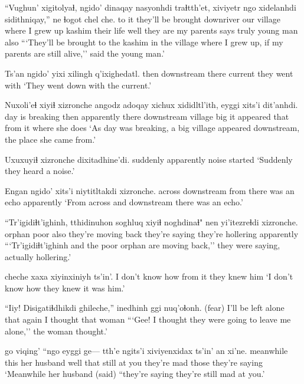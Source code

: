 \documentclass[12pt]{article}
\begin{document}
\gll ``Vughun' xigitolyaɬ, ngido'    dinaqay     nasyonhdi      traɬtth'et, xiviyetr   ngo  xidelanhdi sidithniqay,'' ne   ɬogot chel che.
{to it} {they'll be brought} downriver {our village} {where I grew up} kashim {their life} well {they are}    {my parents}  says  truly {young man} also
\glt ```They'll be brought to the kashim in the village where I grew up, if my parents are still alive,'' said the young man.'
\glend

\gll Ts'an ngido'     yixi  xilingh q'ixighedatl.
then  downstream there current {they went with }
\glt `They went down with the current.'
\glend

\gll Nuxoli'eɬ       xiyiɬ xizronche angodz adoqay xichux  xididltl'ith, eyggi xits'i  dit'anhdi.
{day is breaking} then   apparently     there  {downstream village} big   {it appeared} that  {from it} {where she does}
\glt `As day was breaking, a big village appeared downstream, the place she came from.'
\glend

\gll Uxuxuyiɬ xizronche dixitadhine'di.
suddenly  apparently      {noise started}
\glt `Suddenly they heard a noise.'
\glend

\gll Engan  ngido'     xits'i niytitltakdi xizronche.
across downstream from   {there was an echo} apparently
\glt `From across and downstream there was an echo.'
\glend

\gll ``Tr'igidiɬt'ighinh, tthidinuhon soghluq xiyiɬ noghdinaɬ" nen             yi'itezreɬdi xizronche.
{}               orphan          poor    also  {they're moving back} {they're saying}  {they're hollering} apparently
\glt ```Tr'igidiɬt'ighinh and the poor orphan are moving back,'' they were saying, actually hollering.'
\glend

       cheche xaxa    xiyinxiniyh  ts'in'.
{I don't know how} {}   {from it} {they knew him}
\glt `I don't know how they knew it was him.'
\glend

\gll ``Iiy! Disigatiɬdhikdi         {ghileche},''   inedhinh   ggi nuq'oɬonh.
(fear) {I'll be left alone} {that again} {I thought} that woman
\glt ```Gee! I thought they were going to leave me alone,'' the woman thought.'
\glend

 go   viqing' ``ngo  eyggi ge--- tth'e ngits'i xiviyenxidax ts'in' an  xi'ne.
meanwhile  this {her husband} well that {} still {at you} {they're mad}  {}  those {they're saying} 
\glt `Meanwhile her husband (said) ``they're saying they're still mad at you.'
\glend
\end{document}
